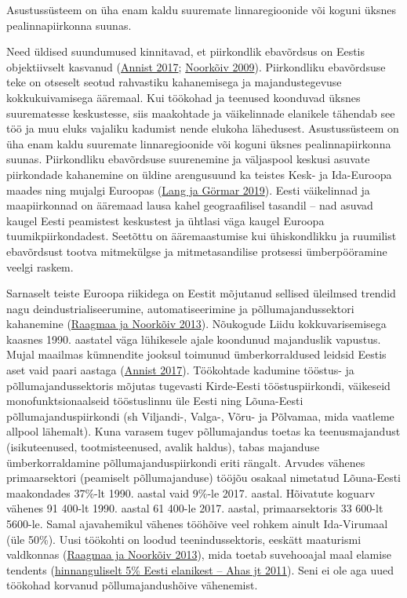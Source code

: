 \documentclass[estonian,]{article}
\begin{document}
\begin{blockquote-left}
Asustussüsteem on üha enam kaldu suuremate linnaregioonide või koguni
üksnes pealinnapiirkonna suunas.
\end{blockquote-left}

Need üldised suundumused kinnitavad, et piirkondlik ebavõrdsus on Eestis objektiivselt kasvanud (\protect\hyperlink{Annist2017}{Annist 2017}; \protect\hyperlink{Noorkuxf5iv2009}{Noorkõiv 2009}). Piirkondliku ebavõrdsuse teke on otseselt seotud rahvastiku kahanemisega ja majandustegevuse kokkukuivamisega ääremaal. Kui töökohad ja teenused koonduvad üksnes suurematesse keskustesse, siis maakohtade ja väikelinnade elanikele tähendab see töö ja muu eluks vajaliku kadumist nende elukoha lähedusest. Asustussüsteem on üha enam kaldu suuremate linnaregioonide või koguni üksnes pealinnapiirkonna suunas. Piirkondliku ebavõrdsuse suurenemine ja väljaspool keskusi asuvate piirkondade kahanemine on üldine arengusuund ka teistes Kesk- ja Ida-Euroopa maades ning mujalgi Euroopas (\protect\hyperlink{Lang2019}{Lang ja Görmar 2019}). Eesti väikelinnad ja maapiirkonnad on ääremaad lausa kahel geograafilisel tasandil -- nad asuvad kaugel Eesti peamistest keskustest ja ühtlasi väga kaugel Euroopa tuumikpiirkondadest. Seetõttu on ääremaastumise kui ühiskondlikku ja ruumilist ebavõrdsust tootva mitmekülgse ja mitmetasandilise protsessi ümberpööramine veelgi raskem.

Sarnaselt teiste Euroopa riikidega on Eestit mõjutanud sellised üleilmsed trendid nagu deindustrialiseerumine, automatiseerimine ja põllumajandussektori kahanemine (\protect\hyperlink{Raagmaa2013}{Raagmaa ja Noorkõiv 2013}). Nõukogude Liidu kokkuvarisemisega kaasnes 1990. aastatel väga lühikesele ajale koondunud majanduslik vapustus. Mujal maailmas kümnendite jooksul toimunud ümberkorraldused leidsid Eestis aset vaid paari aastaga (\protect\hyperlink{Annist2017}{Annist 2017}). Töökohtade kadumine tööstus- ja põllumajandussektoris mõjutas tugevasti Kirde-Eesti tööstuspiirkondi, väikeseid monofunktsionaalseid tööstuslinnu üle Eesti ning Lõuna-Eesti põllumajanduspiirkondi (sh Viljandi-, Valga-, Võru- ja Põlvamaa, mida vaatleme allpool lähemalt). Kuna varasem tugev põllumajandus toetas ka teenusmajandust (isikuteenused, tootmisteenused, avalik haldus), tabas majanduse ümberkorraldamine põllumajanduspiirkondi eriti rängalt. Arvudes vähenes primaarsektori (peamiselt põllumajanduse) tööjõu osakaal nimetatud Lõuna-Eesti maakondades 37\%-lt 1990. aastal vaid 9\%-le 2017. aastal. Hõivatute koguarv vähenes 91 400-lt 1990. aastal 61 400-le 2017. aastal, primaarsektoris 33 600-lt 5600-le. Samal ajavahemikul vähenes tööhõive veel rohkem ainult Ida-Virumaal (üle 50\%). Uusi töökohti on loodud teenindussektoris, eeskätt maaturismi valdkonnas (\protect\hyperlink{Raagmaa2013}{Raagmaa ja Noorkõiv 2013}), mida toetab suvehooajal maal elamise tendents (\protect\hyperlink{Ahas2011}{hinnanguliselt 5\% Eesti elanikest -- Ahas jt 2011}). Seni ei ole aga uued töökohad korvanud põllumajandushõive vähenemist.
\end{document}
